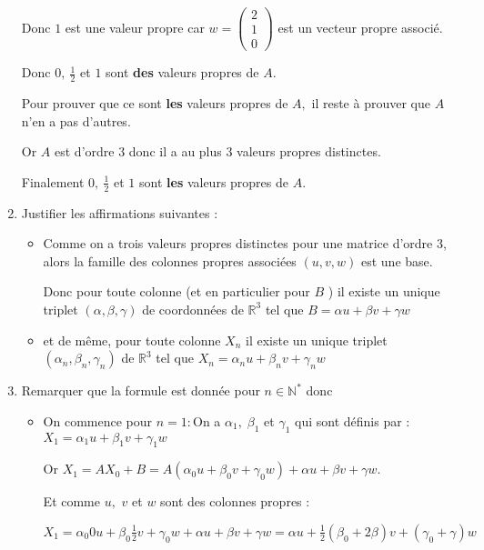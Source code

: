 \documentclass[a4paper, 11pt,reqno]{article}
\begin{document}
\begin{enumerate}
Donc $1$ est une valeur propre car $w=\left( 
\begin{array}{c}
2 \\ 
1 \\ 
0%
\end{array}
\right) $ est un vecteur propre associ\'{e}.

Donc $\displaystyle0,\ \frac{1}{2}$ et $1$ sont \textbf{des} valeurs propres
de $A$.

Pour prouver que ce sont \textbf{les }valeurs propres de $A,$ il reste \`{a}
prouver que $A$ n'en a pas d'autres.

Or $A$ est d'ordre 3 donc il a au plus 3 valeurs propres distinctes.

Finalement $\displaystyle0,~\frac{1}{2}$ et $1$ sont \textbf{les} valeurs
propres de $A$.

\item Justifier les affirmations suivantes :

\begin{itemize}
\item Comme on a trois valeurs propres distinctes pour une matrice d'ordre
3, alors la famille des colonnes propres associ\'{e}es $\left( u,v,w\right) $
est une base.

Donc pour toute colonne (et en particulier pour $B$ ) il existe un unique
triplet $\left( \alpha ,\beta ,\gamma \right) $ de coordonn\'{e}es de $%
\mathbb{R}^{3}$ tel que $B=\alpha u+\beta v+\gamma w$

\item et de m\^{e}me, pour toute colonne $X_{n}$ il existe un unique triplet 
$\left( \alpha _{n},\beta _{n},\gamma _{n}\right) $ de $\mathbb{R}^{3}$ tel
que $X_{n}=\alpha _{n}u+\beta _{n}v+\gamma _{n}w$
\end{itemize}

\item Remarquer que la formule est donn\'{e}e pour $n\in \mathbb{N}^{\ast }$
donc

\begin{itemize}
\item On commence pour $n=1:$On a $\alpha _{1},\;\beta _{1}$ et $\gamma _{1} 
$ qui sont d\'{e}finis par : $X_{1}=\alpha _{1}u+\beta _{1}v+\gamma _{1}w$

Or $X_{1}=AX_{0}+B=A\left( \alpha _{0}u+\beta _{0}v+\gamma _{0}w\right)
+\alpha u+\beta v+\gamma w.$

Et comme $u,$ $v$ et $w$ sont des colonnes propres :

$\displaystyle
X_{1}=\alpha _{0}0u+\beta _{0}\frac{1}{2}v+\gamma _{0}w+\alpha u+\beta
v+\gamma w=\alpha u+\frac{1}{2}\left( \beta _{0}+2\beta \right) v+\left(
\gamma _{0}+\gamma \right) w$


\end{itemize}
\end{enumerate}
\end{document}
